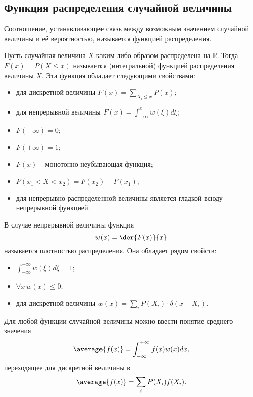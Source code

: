 \subsection{Функция распределения случайной величины}

Соотношение, устанавливающее связь между возможным значением случайной величины
и её вероятностью, называется функцией распределения.

Пусть случайная величина \( X \) каким-либо образом распределена на
\( \mathbb{R} \). Тогда \( F(x) = P(X \le x) \) называется (интегральной)
функцией распределения величины \( X \). Эта функция обладает следующими
свойствами:
\begin{itemize}
    \item для дискретной величины \( F(x) = \sum_{X_i \le x}P(x) \);
    \item для непрерывной величины \( F(x) = \int_{-\infty}^x w(\xi)d\xi \);
    \item \( F(-\infty) = 0 \);
    \item \( F(+\infty) = 1 \);
    \item \( F(x) \) -- монотонно неубывающая функция;
    \item \( P(x_1 < X < x_2) = F(x_2) - F(x_1) \);
    \item для непрерывно распределенной величины является гладкой всюду
        непрерывной функцией.
\end{itemize}
В случае непрерывной величины функция
\[
    w(x) = \der{F(x)}{x}
\]
называется плотностью распределения. Она обладает рядом свойств:
\begin{itemize}
    \item \( \int_{-\infty}^{+\infty} w(\xi) d\xi = 1 \);
    \item \( \forall x\ w(x) \le 0 \);
    \item для дискретной величины
        \( w(x) = \sum_i P(X_i) \cdot \delta(x - X_i) \).
\end{itemize}

Для любой функции случайной величины можно ввести понятие среднего значения
\[
    \average{f(x)} = \int_{-\infty}^{+\infty}f(x)w(x)dx,
\]
переходящее для дискретной величины в
\[
    \average{f(x)} = \sum_i P(X_i)f(X_i).
\]
